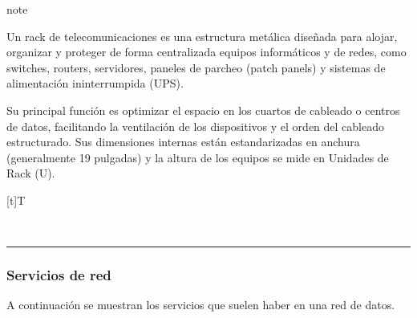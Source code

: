 \documentclass[letterpaper,10pt,spanish]{sphinxmanual}
\let\sphinxpxdimen\pdfpxdimen\else\newdimen\sphinxpxdimen
\begin{document}
\begin{sphinxadmonition}{note}{}

\sphinxAtStartPar
Un rack de telecomunicaciones es una estructura metálica diseñada para alojar, organizar y proteger de forma centralizada equipos informáticos y de redes, como switches, routers, servidores, paneles de parcheo (patch panels) y sistemas de alimentación ininterrumpida (UPS).

\sphinxAtStartPar
Su principal función es optimizar el espacio en los cuartos de cableado o centros de datos, facilitando la ventilación de los dispositivos y el orden del cableado estructurado. Sus dimensiones internas están estandarizadas en anchura (generalmente 19 pulgadas) y la altura de los equipos se mide en Unidades de Rack (U).


\begin{savenotes}\sphinxattablestart
\sphinxthistablewithglobalstyle
\centering
\begin{tabulary}{\linewidth}[t]{T}
\sphinxtoprule
\sphinxtableatstartofbodyhook

\begin{sphinxfigure-in-table}
\centering
\capstart
\noindent\sphinxincludegraphics[width=400\sphinxpxdimen]{{image101}.png}
\label{\detokenize{1_guias/10informatica/G1003:id10}}\end{sphinxfigure-in-table}\relax
\\
\sphinxbottomrule
\end{tabulary}
\sphinxtableafterendhook\par
\sphinxattableend\end{savenotes}
\end{sphinxadmonition}


\bigskip\hrule\bigskip



\subsubsection{Servicios de red}
\label{\detokenize{1_guias/10informatica/G1003:servicios-de-red}}
\sphinxAtStartPar
A continuación se muestran los servicios que suelen haber en una red de datos.
\end{document}
